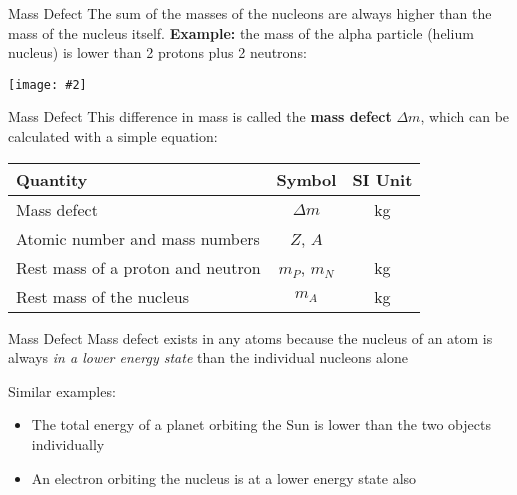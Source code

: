\documentclass[12pt,compress,aspectratio=169]{beamer}
\newcommand{\pic}[2]{\texttt{[image: \#2]}}
\newcommand{\eq}[2]{
  \vspace{#1}{\Large\begin{displaymath}#2\end{displaymath}}
}
\begin{document}
\begin{frame}{Mass Defect}
  The sum of the masses of the nucleons are always higher than the mass of the
  nucleus itself. \textbf{Example:} the mass of the alpha particle (helium
  nucleus) is lower than 2 protons plus 2 neutrons:
  \begin{center}
    \pic{.45}{graphics/nucbind}
  \end{center}

\end{frame}



%



\begin{frame}{Mass Defect}
  This difference in mass is called the \textbf{mass defect} $\Delta m$, which
  can be calculated with a simple equation:
  
  \eq{-.2in}{
    \boxed{
      \Delta m=\left[Zm_P+(A-Z)m_N\right]-m_A
    }
  }
  \begin{center}
    \begin{tabular}{l|c|c}
      \rowcolor{pink}
      \textbf{Quantity}        & \textbf{Symbol} & \textbf{SI Unit} \\ \hline
      Mass defect              & $\Delta m$ & \si{\kilo\gram}\\
      Atomic number and mass numbers & $Z$, $A$ & \\
      Rest mass of a proton and neutron & $m_P$, $m_N$ & \si{\kilo\gram}\\
      Rest mass of the nucleus & $m_A$ & \si{\kilo\gram}\\
    \end{tabular}
  \end{center}
\end{frame}



\begin{frame}{Mass Defect}
  Mass defect exists in any atoms because the nucleus of an atom is always
  \emph{in a lower energy state} than the individual nucleons alone
  
  \vspace{.25in}Similar examples:
  \begin{itemize}
  \item The total energy of a planet orbiting the Sun is lower than the two
    objects individually
  \item An electron orbiting the nucleus is at a lower energy state also
  \end{itemize}
\end{frame}
\end{document}
